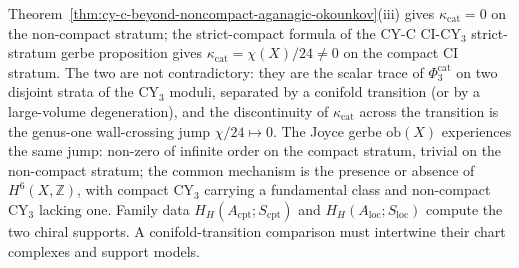 \begin{remark}
\label{rem:cy-c-beyond-noncompact-compact-consistency}
Theorem~\ref{thm:cy-c-beyond-noncompact-aganagic-okounkov}(iii)
gives $\kappa_{\mathrm{cat}} = 0$ on the non-compact stratum; the
strict-compact formula of
the CY-C CI-CY$_3$ strict-stratum gerbe proposition gives
$\kappa_{\mathrm{cat}} = \chi(X)/24 \neq 0$ on the compact CI
stratum. The two are not contradictory: they are the scalar
trace of $\Phi_3^{\mathrm{cat}}$ on two disjoint strata of the
CY$_3$ moduli, separated by a conifold transition (or by a
large-volume degeneration), and the discontinuity of
$\kappa_{\mathrm{cat}}$ across the transition is the genus-one
wall-crossing jump $\chi/24 \mapsto 0$. The Joyce gerbe
$\mathrm{ob}(X)$ experiences the same jump: non-zero of infinite
order on the compact stratum, trivial on the non-compact
stratum; the common mechanism is the presence or absence of
$H^6(X, \mathbb Z)$, with compact CY$_3$ carrying a fundamental
class and non-compact CY$_3$ lacking one.  Family data
$H_H(A_{\mathrm{cpt}};S_{\mathrm{cpt}})$ and
$H_H(A_{\mathrm{loc}};S_{\mathrm{loc}})$ compute the two chiral
supports.  A conifold-transition comparison must intertwine their
chart complexes and support models.
\end{remark}

